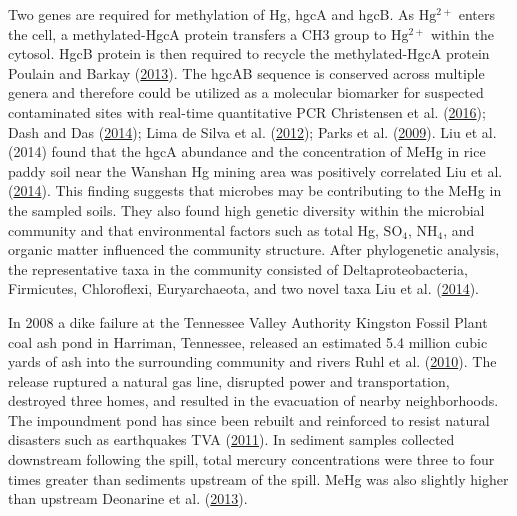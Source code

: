 \documentclass[ms]{uncgdissertationexp}
\theoremstyle{plain}
\theoremstyle{definition}
\theoremstyle{remark}
\begin{document}
  Two genes are required for methylation of Hg, hgcA and hgcB. As
  \(\mathrm{Hg^{2+}}\) enters the cell, a methylated-HgcA protein
  transfers a CH3 group to \(\mathrm{Hg^{2+}}\) within the cytosol. HgcB
  protein is then required to recycle the methylated-HgcA protein Poulain
  and Barkay
  (\protect\hyperlink{ref-poulainCrackingMercuryMethylation2013}{2013}).
  The hgcAB sequence is conserved across multiple genera and therefore
  could be utilized as a molecular biomarker for suspected contaminated
  sites with real-time quantitative PCR Christensen et al.
  (\protect\hyperlink{ref-christensenDevelopmentValidationBroadRange2016}{2016});
  Dash and Das
  (\protect\hyperlink{ref-dashBioremediationPotentialMercury2014}{2014});
  Lima de Silva et al.
  (\protect\hyperlink{ref-limadesilvaHeavyMetalTolerance2012}{2012});
  Parks et al.
  (\protect\hyperlink{ref-parksMechanismHgProtonolysis2009}{2009}). Liu et
  al. (2014) found that the hgcA abundance and the concentration of MeHg
  in rice paddy soil near the Wanshan Hg mining area was positively
  correlated Liu et al.
  (\protect\hyperlink{ref-liuAnalysisMicrobialCommunity2014}{2014}). This
  finding suggests that microbes may be contributing to the MeHg in the
  sampled soils. They also found high genetic diversity within the
  microbial community and that environmental factors such as total Hg,
  \(\mathrm{SO_4}\), \(\mathrm{NH_4}\), and organic matter influenced the
  community structure. After phylogenetic analysis, the representative
  taxa in the community consisted of Deltaproteobacteria, Firmicutes,
  Chloroflexi, Euryarchaeota, and two novel taxa Liu et al.
  (\protect\hyperlink{ref-liuAnalysisMicrobialCommunity2014}{2014}).
  
  In 2008 a dike failure at the Tennessee Valley Authority Kingston Fossil
  Plant coal ash pond in Harriman, Tennessee, released an estimated 5.4
  million cubic yards of ash into the surrounding community and rivers
  Ruhl et al.
  (\protect\hyperlink{ref-ruhlEnvironmentalImpactsCoal2010}{2010}). The
  release ruptured a natural gas line, disrupted power and transportation,
  destroyed three homes, and resulted in the evacuation of nearby
  neighborhoods. The impoundment pond has since been rebuilt and
  reinforced to resist natural disasters such as earthquakes TVA
  (\protect\hyperlink{ref-tvaFactSheetKingston2011}{2011}). In sediment
  samples collected downstream following the spill, total mercury
  concentrations were three to four times greater than sediments upstream
  of the spill. MeHg was also slightly higher than upstream Deonarine et
  al.
  (\protect\hyperlink{ref-deonarineEnvironmentalImpactsTennessee2013}{2013}).
  
\end{document}
